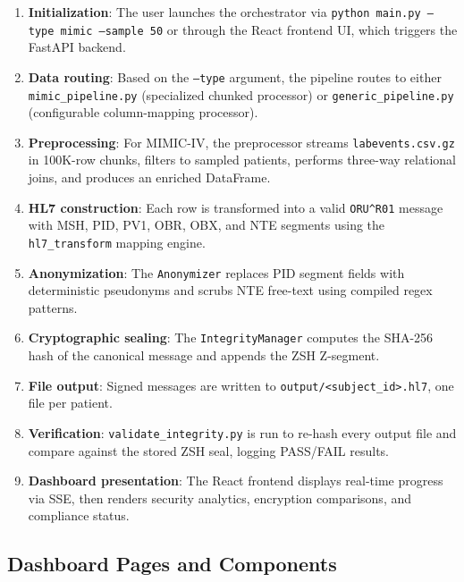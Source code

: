 \documentclass[12pt,a4paper]{report}
\begin{document}
\begin{enumerate}
    \item \textbf{Initialization}: The user launches the orchestrator via
    \texttt{python main.py --type mimic --sample 50} or through the React frontend
    UI, which triggers the FastAPI backend.
    \item \textbf{Data routing}: Based on the \texttt{--type} argument, the pipeline
    routes to either \texttt{mimic\_pipeline.py} (specialized chunked processor) or
    \texttt{generic\_pipeline.py} (configurable column-mapping processor).
    \item \textbf{Preprocessing}: For MIMIC-IV, the preprocessor streams
    \texttt{labevents.csv.gz} in 100K-row chunks, filters to sampled patients,
    performs three-way relational joins, and produces an enriched DataFrame.
    \item \textbf{HL7 construction}: Each row is transformed into a valid
    \texttt{ORU\string^R01} message with MSH, PID, PV1, OBR, OBX, and NTE segments
    using the \texttt{hl7\_transform} mapping engine.
    \item \textbf{Anonymization}: The \texttt{Anonymizer} replaces PID segment fields
    with deterministic pseudonyms and scrubs NTE free-text using compiled regex
    patterns.
    \item \textbf{Cryptographic sealing}: The \texttt{IntegrityManager} computes the
    SHA-256 hash of the canonical message and appends the ZSH Z-segment.
    \item \textbf{File output}: Signed messages are written to
    \texttt{output/<subject\_id>.hl7}, one file per patient.
    \item \textbf{Verification}: \texttt{validate\_integrity.py} is run to re-hash
    every output file and compare against the stored ZSH seal, logging PASS/FAIL
    results.
    \item \textbf{Dashboard presentation}: The React frontend displays real-time
    progress via SSE, then renders security analytics, encryption comparisons, and
    compliance status.
\end{enumerate}

\subsection{Dashboard Pages and Components}
\end{document}
